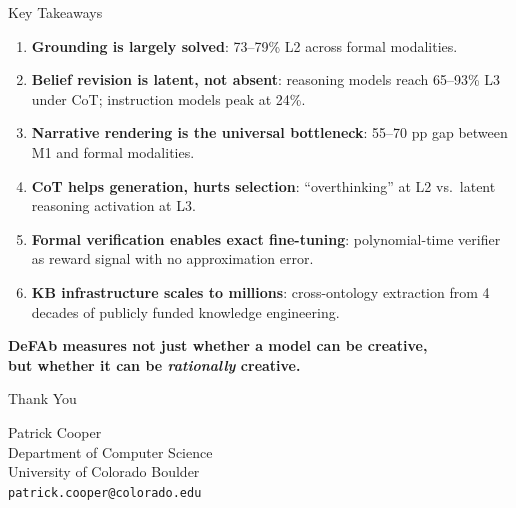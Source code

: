 \documentclass[aspectratio=169]{beamer}
\begin{document}
\begin{frame}{Key Takeaways}

\small
\begin{enumerate}\setlength\itemsep{4pt}
    \item \textbf{Grounding is largely solved}: 73--79\% L2 across formal modalities.
    \item \textbf{Belief revision is latent, not absent}: reasoning models reach 65--93\% L3 under CoT; instruction models peak at 24\%.
    \item \textbf{Narrative rendering is the universal bottleneck}: 55--70 pp gap between M1 and formal modalities.
    \item \textbf{CoT helps generation, hurts selection}: ``overthinking'' at L2 vs.\ latent reasoning activation at L3.
    \item \textbf{Formal verification enables exact fine-tuning}: polynomial-time verifier as reward signal with no approximation error.
    \item \textbf{KB infrastructure scales to millions}: cross-ontology extraction from 4 decades of publicly funded knowledge engineering.
\end{enumerate}

\vspace{0.5em}
\begin{center}
\textbf{DeFAb measures not just whether a model can be creative,\\but whether it can be \textit{rationally} creative.}
\end{center}
\end{frame}


\begin{frame}[standout]
\begin{center}
\Large
Thank You

\vspace{2em}
\normalsize
Patrick Cooper\\
Department of Computer Science\\
University of Colorado Boulder\\[1em]
\texttt{patrick.cooper@colorado.edu}
\end{center}
\end{frame}
\end{document}
